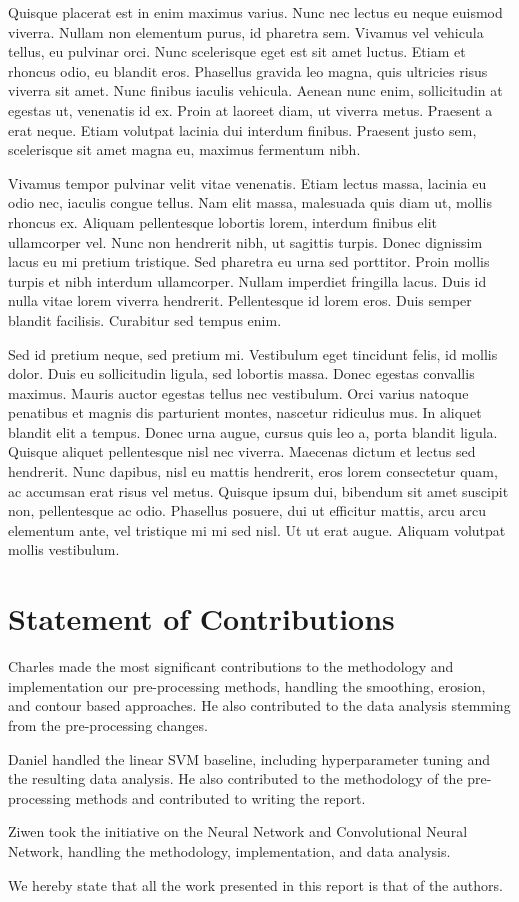 \documentclass[conference]{IEEEtran}
\begin{document}
Quisque placerat est in enim maximus varius. Nunc nec lectus eu neque euismod viverra. Nullam non elementum purus, id pharetra sem. Vivamus vel vehicula tellus, eu pulvinar orci. Nunc scelerisque eget est sit amet luctus. Etiam et rhoncus odio, eu blandit eros. Phasellus gravida leo magna, quis ultricies risus viverra sit amet. Nunc finibus iaculis vehicula. Aenean nunc enim, sollicitudin at egestas ut, venenatis id ex. Proin at laoreet diam, ut viverra metus. Praesent a erat neque. Etiam volutpat lacinia dui interdum finibus. Praesent justo sem, scelerisque sit amet magna eu, maximus fermentum nibh.

Vivamus tempor pulvinar velit vitae venenatis. Etiam lectus massa, lacinia eu odio nec, iaculis congue tellus. Nam elit massa, malesuada quis diam ut, mollis rhoncus ex. Aliquam pellentesque lobortis lorem, interdum finibus elit ullamcorper vel. Nunc non hendrerit nibh, ut sagittis turpis. Donec dignissim lacus eu mi pretium tristique. Sed pharetra eu urna sed porttitor. Proin mollis turpis et nibh interdum ullamcorper. Nullam imperdiet fringilla lacus. Duis id nulla vitae lorem viverra hendrerit. Pellentesque id lorem eros. Duis semper blandit facilisis. Curabitur sed tempus enim.

Sed id pretium neque, sed pretium mi. Vestibulum eget tincidunt felis, id mollis dolor. Duis eu sollicitudin ligula, sed lobortis massa. Donec egestas convallis maximus. Mauris auctor egestas tellus nec vestibulum. Orci varius natoque penatibus et magnis dis parturient montes, nascetur ridiculus mus. In aliquet blandit elit a tempus. Donec urna augue, cursus quis leo a, porta blandit ligula. Quisque aliquet pellentesque nisl nec viverra. Maecenas dictum et lectus sed hendrerit. Nunc dapibus, nisl eu mattis hendrerit, eros lorem consectetur quam, ac accumsan erat risus vel metus. Quisque ipsum dui, bibendum sit amet suscipit non, pellentesque ac odio. Phasellus posuere, dui ut efficitur mattis, arcu arcu elementum ante, vel tristique mi mi sed nisl. Ut ut erat augue. Aliquam volutpat mollis vestibulum. 

\section{Statement of Contributions}

Charles made the most significant contributions to the methodology and implementation our pre-processing methods, handling the smoothing, erosion, and contour based approaches. He also contributed to the data analysis stemming from the pre-processing changes.

Daniel handled the linear SVM baseline, including hyperparameter tuning and the resulting data analysis. He also contributed to the methodology of the pre-processing methods and contributed to writing the report.

Ziwen took the initiative on the Neural Network and Convolutional Neural Network, handling the methodology, implementation, and data analysis.

We hereby state that all the work presented in this report is that of the authors. 
\end{document}
